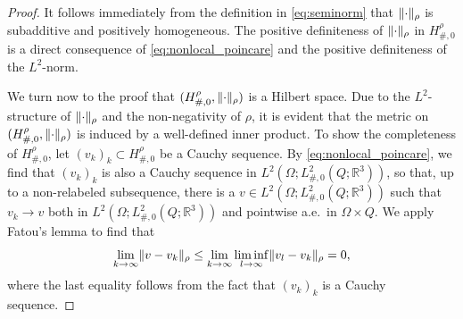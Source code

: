\documentclass[reqno,11pt]{amsart}
\numberwithin{equation}{section}
\theoremstyle{thmlemcorr}
\numberwithin{theorem}{section}
\theoremstyle{thmlemcorr*}
\theoremstyle{defi}
\theoremstyle{remexample}
\theoremstyle{ass}
\newcommand{\R}{\mathbb{R}}
\DeclarePairedDelimiter{\norm}{\lVert}{\rVert}
\newcommand{\1}{\mathds{1}}
\newcommand{\Om}{\Omega}
\newcommand{\seq}[1]{(#1_k)_{k}}
\begin{document}
\begin{proof}
    It follows immediately from the definition in \eqref{eq:seminorm} that \(\norm{\cdot}_\rho\) is subadditive and positively homogeneous. The positive definiteness of \(\norm{\cdot}_\rho\) in \(H^\rho_{\#,0}\) is a direct consequence of \eqref{eq:nonlocal_poincare} and the positive definiteness of the \(L^2\)-norm.

    We turn now to the proof that \((H^\rho_{\#,0},\norm{\cdot}_\rho) \) is a Hilbert space. Due to the \(L^2\)-structure of \(\norm{\cdot}_\rho\) and the non-negativity of $\rho$, it is evident that the metric on \((H^\rho_{\#,0},\norm{\cdot}_\rho)\) is induced by a well-defined inner product.
    To show the completeness of \(H^\rho_{\#,0}\), let \(\seq{v}\subset H^\rho_{\#,0}\) be a Cauchy sequence. By \eqref{eq:nonlocal_poincare}, we find that $\seq{v}$ is also a Cauchy sequence in $L^2(\Om;L^2_{\#,0}(Q;\R^3))$, so that, up to a non-relabeled subsequence, there is a $v \in L^2(\Om;L^2_{\#,0}(Q;\R^3))$ such that $v_k \to v$ both in $L^2(\Om;L^2_{\#,0}(Q;\R^3))$ and pointwise a.e.~in $\Omega \times Q$. We apply Fatou's lemma to find that
    \begin{equation*}
        \lim_{k\to \infty}\norm{v-v_k}_\rho
        \le  \lim_{k\to \infty}\liminf_{l\to\infty} \norm{v_l-v_k}_\rho
        =0,
    \end{equation*}
    where the last equality follows from the fact that $\seq{v}$ is a Cauchy sequence.
    \end{proof}
    
    
    
\end{document}
